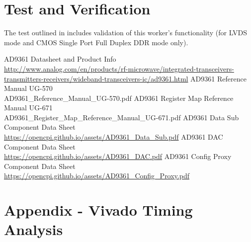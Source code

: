 \documentclass{article}
\begin{document}
\section*{Test and Verification}
The test outlined in \cite{dac_comp_datasheet} includes validation of this worker's functionality (for LVDS mode and CMOS Single Port Full Duplex DDR mode only).
\pagebreak
\begin{thebibliography}{1}

 AD9361 Datasheet and Product Info \\
\url{http://www.analog.com/en/products/rf-microwave/integrated-transceivers-transmitters-receivers/wideband-transceivers-ic/ad9361.html}
 AD9361 Reference Manual UG-570\\
AD9361\_Reference\_Manual\_UG-570.pdf
 AD9361 Register Map Reference Manual UG-671\\
AD9361\_Register\_Map\_Reference\_Manual\_UG-671.pdf
  AD9361 Data Sub Component Data Sheet \\
 \url{https://opencpi.github.io/assets/AD9361_Data_Sub.pdf}
  AD9361 DAC Component Data Sheet \\
 \url{https://opencpi.github.io/assets/AD9361_DAC.pdf}
  AD9361 Config Proxy Component Data Sheet \\
 \url{https://opencpi.github.io/assets/AD9361_Config_Proxy.pdf}

\end{thebibliography}
\pagebreak

\section{Appendix - Vivado Timing Analysis} \label{appendix}
\end{document}
